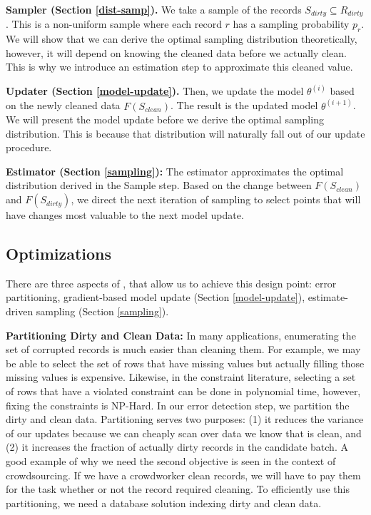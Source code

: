 \vspace{0.5em}

\noindent\textbf{Sampler (Section \ref{dist-samp}). } We take a sample of the records $S_{dirty} \subseteq R_{dirty}$. This is a non-uniform sample where each record $r$ has a sampling probability $p_r$.
We will show that we can derive the optimal sampling distribution theoretically, however, it will depend on knowing the cleaned data before we actually clean. This is why we introduce an estimation step to approximate this cleaned value.

\vspace{0.5em}

\noindent\textbf{Updater (Section \ref{model-update}). } Then, we update the model $\theta^{(i)}$ based on the newly cleaned data $F(S_{clean})$. The result is the updated model $\theta^{(i+1)}$. We will present the model update before we derive the optimal sampling distribution.
This is because that distribution will naturally fall out of our update procedure.

\vspace{0.5em}

\noindent\textbf{Estimator (Section \ref{sampling}): } The estimator approximates the optimal distribution derived in the Sample step. Based on the change between $F(S_{clean})$ and $F(S_{dirty})$, we direct the next iteration of sampling to select points that will have changes most valuable to the next model update.

\iffalse
\subsection{Optimizations}
There are three aspects of \sys, that allow us to achieve this design point: error partitioning, gradient-based model update (Section \ref{model-update}), estimate-driven sampling (Section \ref{sampling}).

\vspace{0.5em}

\noindent\textbf{Partitioning Dirty and Clean Data: } In many applications, enumerating the set of corrupted records is much easier than cleaning them. For example, we may be able to select the set of rows that have missing values but actually filling those missing values is expensive. Likewise, in the constraint literature, selecting a set of rows that have a violated constraint can be done in polynomial time, however, fixing the constraints is NP-Hard.
In our error detection step, we partition the dirty and clean data.
Partitioning serves two purposes: (1) it reduces the variance of our updates because we can cheaply scan over data we know that is clean, and (2) it increases the fraction of actually dirty records in the candidate batch.
A good example of why we need the second objective is seen in the context of crowdsourcing.
If we have a crowdworker clean records, we will have to pay them for the task whether or not the record required cleaning.
To efficiently use this partitioning, we need a database solution indexing dirty and clean data.

